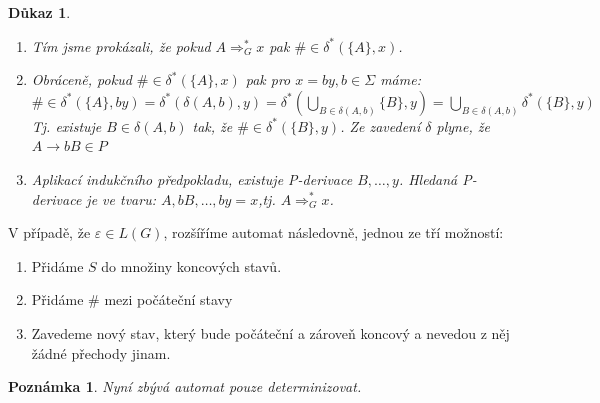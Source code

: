 \documentclass[10pt, a4paper, titlepage]{article}
\theoremstyle{note}
\newtheorem{dukaz}{\textbf{Důkaz}}
\newtheorem{poznamka}{\textbf{Poznámka}}
\begin{document}
\begin{dukaz}
\begin{enumerate}
\item
Tím jsme prokázali, že pokud $A \Rightarrow^*_G x$ pak $\# \in \delta^* ( \lbrace A \rbrace , x )$.

\item
Obráceně, pokud $\#\in \delta^* ( \lbrace A \rbrace , x )$ pak pro $x=by, b\in \Sigma$ máme: $ \#\in \delta^* ( \lbrace A \rbrace , by ) = \delta^* ( \delta (A,b), y ) = \delta^* (\bigcup_{B\in\delta(A,b)}{\lbrace B \rbrace}, y) = \bigcup_{B\in\delta(A,b)}{\delta^* ( \lbrace B \rbrace , y)}$
Tj. existuje $ B \in \delta (A,b) $ tak, že $ \#\in\delta^* ( \lbrace B \rbrace ,y)$. Ze zavedení $\delta$ plyne, že $A \rightarrow bB \in P$

\item
Aplikací indukčního předpokladu, existuje P-derivace $B,\ldots,y$. Hledaná P-derivace je ve tvaru: $A,bB,\ldots,by=x$,tj. $A \Rightarrow^*_Gx$.
\end{enumerate}
\end{dukaz}

V případě, že $\varepsilon \in L(G)$, rozšíříme automat následovně, jednou ze tří možností:
\begin{enumerate}
\item
Přidáme $S$ do množiny koncových stavů.

\item
Přidáme $\#$ mezi počáteční stavy

\item
Zavedeme nový stav, který bude počáteční a zároveň koncový a nevedou z něj žádné přechody jinam.
\end{enumerate}

\begin{poznamka}
Nyní zbývá automat pouze determinizovat.
\end{poznamka}
\end{document}
